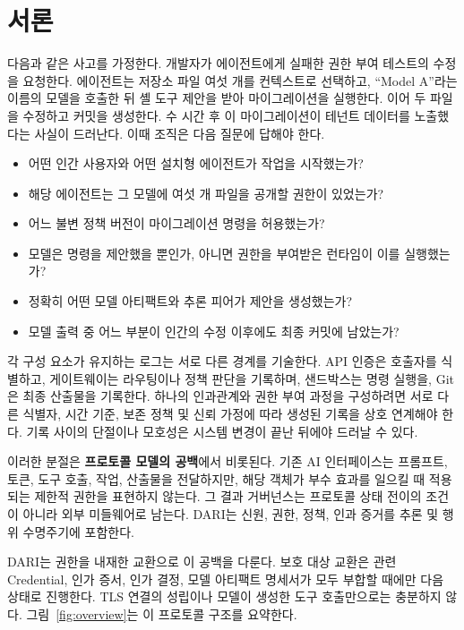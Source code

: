 \documentclass[10pt]{article}
\newcommand{\dariname}{DARI}
\renewcommand{\emph}[1]{\textbf{#1}}
\begin{document}
\section{서론}

다음과 같은 사고를 가정한다. 개발자가 에이전트에게 실패한 권한 부여 테스트의 수정을 요청한다. 에이전트는 저장소 파일 여섯 개를 컨텍스트로 선택하고, ``Model A''라는 이름의 모델을 호출한 뒤 셸 도구 제안을 받아 마이그레이션을 실행한다. 이어 두 파일을 수정하고 커밋을 생성한다. 수 시간 후 이 마이그레이션이 테넌트 데이터를 노출했다는 사실이 드러난다. 이때 조직은 다음 질문에 답해야 한다.

\begin{itemize}
  \item 어떤 인간 사용자와 어떤 설치형 에이전트가 작업을 시작했는가?
  \item 해당 에이전트는 그 모델에 여섯 개 파일을 공개할 권한이 있었는가?
  \item 어느 불변 정책 버전이 마이그레이션 명령을 허용했는가?
  \item 모델은 명령을 제안했을 뿐인가, 아니면 권한을 부여받은 런타임이 이를 실행했는가?
  \item 정확히 어떤 모델 아티팩트와 추론 피어가 제안을 생성했는가?
  \item 모델 출력 중 어느 부분이 인간의 수정 이후에도 최종 커밋에 남았는가?
\end{itemize}

각 구성 요소가 유지하는 로그는 서로 다른 경계를 기술한다. API 인증은 호출자를 식별하고, 게이트웨이는 라우팅이나 정책 판단을 기록하며, 샌드박스는 명령 실행을, Git은 최종 산출물을 기록한다. 하나의 인과관계와 권한 부여 과정을 구성하려면 서로 다른 식별자, 시간 기준, 보존 정책 및 신뢰 가정에 따라 생성된 기록을 상호 연계해야 한다. 기록 사이의 단절이나 모호성은 시스템 변경이 끝난 뒤에야 드러날 수 있다.

이러한 분절은 \emph{프로토콜 모델의 공백}에서 비롯된다. 기존 AI 인터페이스는 프롬프트, 토큰, 도구 호출, 작업, 산출물을 전달하지만, 해당 객체가 부수 효과를 일으킬 때 적용되는 제한적 권한을 표현하지 않는다. 그 결과 거버넌스는 프로토콜 상태 전이의 조건이 아니라 외부 미들웨어로 남는다. DARI는 신원, 권한, 정책, 인과 증거를 추론 및 행위 수명주기에 포함한다.

\dariname{}는 권한을 내재한 교환으로 이 공백을 다룬다. 보호 대상 교환은 관련 Credential, 인가 증서, 인가 결정, 모델 아티팩트 명세서가 모두 부합할 때에만 다음 상태로 진행한다. TLS 연결의 성립이나 모델이 생성한 도구 호출만으로는 충분하지 않다. 그림~\ref{fig:overview}는 이 프로토콜 구조를 요약한다.
\end{document}
